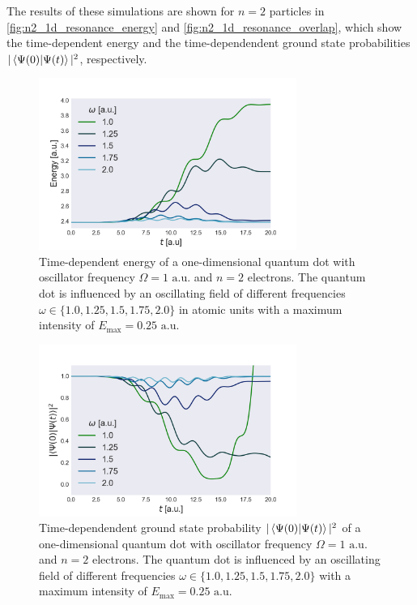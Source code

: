 The results of these 
simulations are shown for $n=2$ particles in \autoref{fig:n2_1d_resonance_energy}
and \autoref{fig:n2_1d_resonance_overlap}, which show the time-dependent energy 
and the time-dependendent ground state probabilities
$|\braket{\Psi(0)}{\Psi(t)}|^2$, respectively.

\begin{figure}
    \centering
    \includegraphics[width=0.75\textwidth]{results/figures/1D/n2_resonance_energy.png} 
    \caption{Time-dependent energy of a one-dimensional quantum dot with
        oscillator frequency $\Omega=1\text{ a.u.}$ and $n=2$ electrons.
        The quantum dot is influenced by an oscillating field of different 
        frequencies $\omega\in\{1.0, 1.25, 1.5, 1.75, 2.0\}$ in atomic units
        with a maximum 
        intensity of $E_\text{max} = 0.25\text{ a.u.}$
    }
    \label{fig:n2_1d_resonance_energy}
\end{figure}

\begin{figure}
    \centering
    \includegraphics[width=0.75\textwidth]{results/figures/1D/n2_resonance_overlap.png} 
    \caption{Time-dependendent ground state probability $|\braket{\Psi(0)}{\Psi(t)}|^2$
        of a one-dimensional quantum dot with
        oscillator frequency $\Omega=1 \text{ a.u.}$ and $n=2$ electrons.
        The quantum dot is influenced by an oscillating field of different 
        frequencies $\omega\in\{1.0, 1.25, 1.5, 1.75, 2.0\}$ with a maximum 
        intensity of $E_\text{max} = 0.25\text{ a.u.}$
    }
    \label{fig:n2_1d_resonance_overlap}
\end{figure}

